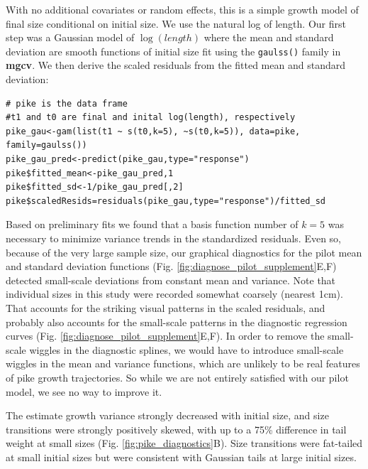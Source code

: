 \documentclass[12pt]{article}
\begin{document}
\begin{spacing}{1.35}
With no additional covariates or random effects, this is a simple growth model of final size conditional on initial size. 
We use the natural log of length. 
Our first step was a Gaussian model of $\log(length)$ where the mean and standard deviation are smooth functions of initial size fit using the \texttt{gaulss()} family in \textbf{mgcv}. 
We then derive the scaled residuals from the fitted mean and standard deviation:
\begin{lstlisting}
# pike is the data frame
#t1 and t0 are final and inital log(length), respectively
pike_gau<-gam(list(t1 ~ s(t0,k=5), ~s(t0,k=5)), data=pike, family=gaulss())
pike_gau_pred<-predict(pike_gau,type="response")
pike$fitted_mean<-pike_gau_pred,1
pike$fitted_sd<-1/pike_gau_pred[,2]
pike$scaledResids=residuals(pike_gau,type="response")/fitted_sd
\end{lstlisting}
Based on preliminary fits we found that a basis function number of $k=5$ was necessary to minimize variance trends in the standardized residuals. Even so, because of the very large sample size, our graphical diagnostics for the
pilot mean and standard deviation functions (Fig. \ref{fig:diagnose_pilot_supplement}E,F) detected small-scale 
deviations from constant mean and variance. Note that individual sizes in this study were recorded somewhat coarsely 
(nearest 1cm). That accounts for the striking visual patterns in the scaled residuals, and probably also 
accounts for the small-scale patterns in the diagnostic regression curves (Fig. \ref{fig:diagnose_pilot_supplement}E,F). 
In order to remove the small-scale wiggles in the diagnostic splines, we would have to introduce
small-scale wiggles in the mean and variance functions, which are unlikely to be real features of pike growth
trajectories. So while we are not entirely satisfied with our pilot model, we see no way to improve it.

The estimate growth variance strongly decreased with initial size, and size transitions were strongly positively skewed, with up to a 75\% difference in tail weight at small sizes (Fig. \ref{fig:pike_diagnostics}B). 
Size transitions were fat-tailed at small initial sizes but were consistent with Gaussian tails at large initial sizes. 


\end{spacing}
\end{document}
